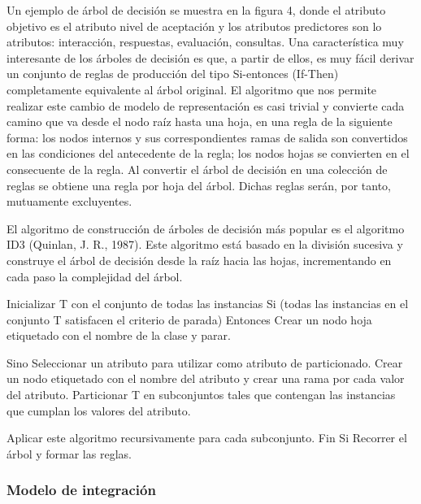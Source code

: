 Un ejemplo de árbol de decisión se muestra en la figura 4, donde el
atributo objetivo es el atributo nivel de aceptación y los atributos predictores
son lo atributos: interacción, respuestas, evaluación, consultas. Una
característica muy interesante de los árboles de decisión es que, a
partir de ellos, es muy fácil derivar un conjunto de reglas de producción del
tipo Si-entonces (If-Then) completamente equivalente al árbol original. El
algoritmo que nos permite realizar este cambio de modelo de representación
es casi trivial y convierte cada camino que va desde el nodo raíz hasta una
hoja, en una regla de la siguiente forma: los nodos internos y sus correspondientes
ramas de salida son convertidos en las condiciones del antecedente de la regla; los nodos hojas se convierten en el consecuente de la regla. Al convertir el árbol de decisión en una colección de reglas se obtiene una regla por hoja del árbol. Dichas reglas serán, por tanto, mutuamente excluyentes.

El algoritmo de construcción de árboles de decisión más popular es el algoritmo ID3 (Quinlan, J. R., 1987). Este algoritmo está basado en la división sucesiva y construye el árbol de decisión desde la raíz hacia las hojas, incrementando en cada paso la complejidad del árbol.

Inicializar T con el conjunto de todas las instancias Si (todas las instancias en el conjunto T satisfacen el criterio de parada) Entonces Crear un nodo hoja etiquetado con el nombre de la clase y  parar.

Sino Seleccionar un atributo para utilizar como atributo de particionado.
Crear un nodo etiquetado con el nombre del atributo y crear una rama por cada valor del atributo.
Particionar T en subconjuntos tales que contengan las instancias que cumplan los valores del atributo.

Aplicar este algoritmo recursivamente para cada subconjunto.
Fin Si Recorrer el árbol y formar las reglas.


\subsubsection{Modelo de integración}


